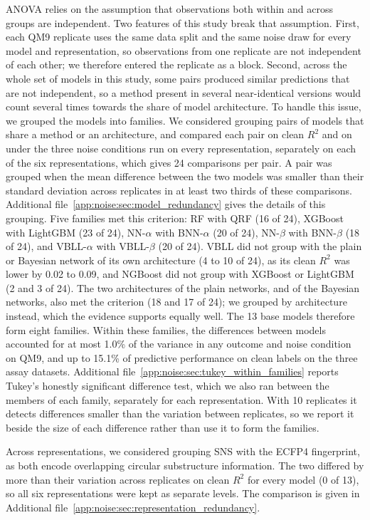 ANOVA relies on the assumption that observations both within and across groups are independent. Two features of this study break that assumption. First, each QM9 replicate uses the same data split and the same noise draw for every model and representation, so observations from one replicate are not independent of each other; we therefore entered the replicate as a block. Second, across the whole set of models in this study, some pairs produced similar predictions that are not independent, so a method present in several near-identical versions would count several times towards the share of model architecture. To handle this issue, we grouped the models into families. We considered grouping pairs of models that share a method or an architecture, and compared each pair on clean $R^2$ and on \aucnorm{} under the three noise conditions run on every representation, separately on each of the six representations, which gives 24 comparisons per pair. A pair was grouped when the mean difference between the two models was smaller than their standard deviation across replicates in at least two thirds of these comparisons. Additional file~\ref{app:noise:sec:model_redundancy} gives the details of this grouping. Five families met this criterion: RF with QRF (16 of 24), XGBoost with LightGBM (23 of 24), NN-$\alpha$ with BNN-$\alpha$ (20 of 24), NN-$\beta$ with BNN-$\beta$ (18 of 24), and VBLL-$\alpha$ with VBLL-$\beta$ (20 of 24). VBLL did not group with the plain or Bayesian network of its own architecture (4 to 10 of 24), as its clean $R^2$ was lower by 0.02 to 0.09, and NGBoost did not group with XGBoost or LightGBM (2 and 3 of 24). The two architectures of the plain networks, and of the Bayesian networks, also met the criterion (18 and 17 of 24); we grouped by architecture instead, which the evidence supports equally well. The 13 base models therefore form eight families. Within these families, the differences between models accounted for at most 1.0\% of the variance in any outcome and noise condition on QM9, and up to 15.1\% of predictive performance on clean labels on the three assay datasets. Additional file~\ref{app:noise:sec:tukey_within_families} reports Tukey's honestly significant difference test, which we also ran between the members of each family, separately for each representation. With 10 replicates it detects differences smaller than the variation between replicates, so we report it beside the size of each difference rather than use it to form the families.

Across representations, we considered grouping SNS with the ECFP4 fingerprint, as both encode overlapping circular substructure information. The two differed by more than their variation across replicates on clean $R^2$ for every model (0 of 13), so all six representations were kept as separate levels. The comparison is given in Additional file~\ref{app:noise:sec:representation_redundancy}.

